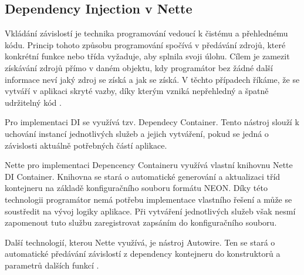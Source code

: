 \documentclass[czech,BP]{thesiskiv}
\begin{document}
		\subsection{Dependency Injection v Nette}
		\par Vkládání závislostí je technika programování vedoucí k čistému a přehlednému kódu. Princip tohoto způsobu programování spočívá v předávání zdrojů, které konkrétní funkce nebo třída vyžaduje, aby splnila svoji úlohu. Cílem je zamezit získávání zdrojů přímo v daném objektu, kdy programátor bez žádné další informace neví jaký zdroj se získá a jak se získá. V těchto případech říkáme, že se vytváří v aplikaci skryté vazby, díky kterým vzniká nepřehledný a špatně udržitelný kód \cite{PHP-DI}.
		\par Pro implementaci DI se využívá tzv. Dependecy Container. Tento nástroj slouží k uchování instancí jednotlivých služeb a jejich vytváření, pokud se jedná o závislosti aktuálně potřebných částí aplikace.
		\par Nette pro implementaci Depencency Containeru využívá vlastní knihovnu Nette DI Container. Knihovna se stará o automatické generování a aktualizaci tříd kontejneru na základě konfiguračního souboru formátu NEON. Díky této technologii programátor nemá potřebu implementace vlastního řešení a může se soustředit na vývoj logiky aplikace. Při vytváření jednotlivých služeb však nesmí zapomenout tuto službu zaregistrovat zapsáním do konfiguračního souboru.
		\par Další technologií, kterou Nette využívá, je nástroj Autowire. Ten se stará o automatické předávání závislostí z dependency kontejneru do konstruktorů a parametrů dalších funkcí \cite{NetteDI}.
		
\end{document}
